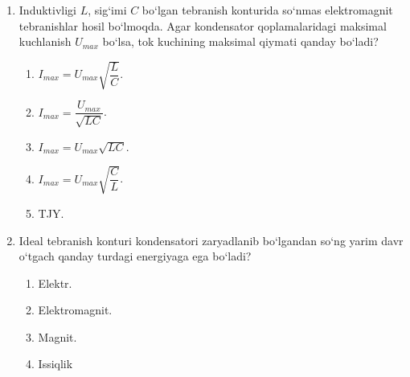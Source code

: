 \begin{enumerate}
\item Induktivligi $L$, sig‘imi $C$ bo‘lgan tebranish konturida so‘nmas elektromagnit tebranishlar hosil bo‘lmoqda. Agar kondensator qoplamalaridagi maksimal kuchlanish $U_{max}$ bo‘lsa, tok kuchining maksimal qiymati qanday bo‘ladi?
\begin{enumerate}[label=\Alph*)]
\item $I_{max}=U_{max}\sqrt{\dfrac{L}{C}}$.
\item $I_{max}=\dfrac{U_{max}}{\sqrt{LC}}$.
\item $I_{max}=U_{max}\sqrt{LC}$.
\item $I_{max}=U_{max}\sqrt{\dfrac{C}{L}}$.
\item TJY.
\end{enumerate}

\item Ideal tebranish konturi kondensatori zaryadlanib bo‘lgandan so‘ng yarim davr o‘tgach qanday turdagi energiyaga ega bo‘ladi?
\begin{enumerate}[label=\Alph*)]
\item Elektr.
\item Elektromagnit.
\item Magnit.
\item Issiqlik
\end{enumerate}

\end{enumerate}


